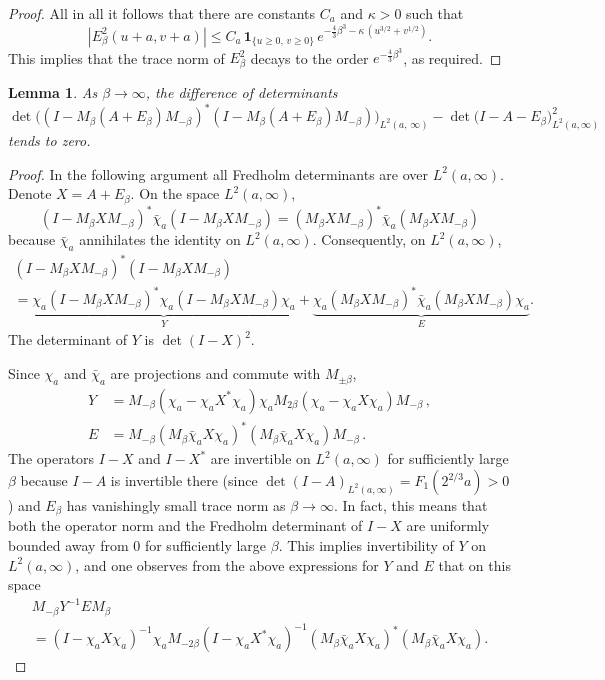 \documentclass[10pt]{amsart}
\newtheorem{lemm}[theo]{Lemma}\newtheorem{prop}[theo]{Proposition}\newtheorem{coro}[theo]{Corollary}\newtheorem{conj}[theo]{Conjecture}
\theoremstyle{definition}\newtheorem{defi}[theo]{Definition}\newtheorem{rema}[theo]{Remark}\newtheorem{exam}[theo]{Example}\newtheorem{exem}[theo]{Example}\newtheorem{nota}[theo]{Notation}
\newcommand{\ind}[1]{\mathbf{1}_{\{ #1 \}}}
\begin{document}
\begin{proof}
All in all it follows that there are constants $C_a$ and $\kappa > 0$ such that
\[
|E^2_{\beta}(u+a,v+a)| \leq C_a\, \ind{u \geq 0,\, v \geq 0}\, e^{-\frac{4}{3}\beta^3 - \kappa\, (u^{3/2} + v^{1/2})}.
\]
This implies that the trace norm of $E^2_{\beta}$ decays to the order $e^{-\frac{4}{3}\beta^3}$, as required.
\end{proof}

\begin{lemm} \label{lem:error2}
As $\beta \to \infty$, the difference of determinants
\[
\det \Big((I - M_{\beta}(A+ E_{\beta})M_{-\beta})^{*}
(I - M_{\beta}(A+ E_{\beta})M_{-\beta})\Big)_{L^2(a,\, \infty)} -
\det \big (I - A- E_{\beta}\big)_{L^2(a,\infty)}^2
\]
tends to zero.
\end{lemm}

\begin{proof}
In the following argument all Fredholm determinants are over $L^2(a,\infty)$. Denote $X = A + E_{\beta}$. On the space $L^2(a,\infty)$,
\[
(I- M_{\beta}XM_{-\beta})^{*} \bar{\chi}_a (I- M_{\beta}XM_{-\beta}) =
(M_{\beta} X M_{-\beta})^{*} \bar{\chi}_a (M_{\beta}XM_{-\beta})
\]
because $\bar{\chi}_a$ annihilates the identity on $L^2(a,\infty)$. Consequently, on $L^2(a,\infty)$,
\begin{multline*}
(I - M_{\beta}XM_{-\beta})^{*}(I - M_{\beta}XM_{-\beta}) \\
= \underbrace{\chi_a(I - M_{\beta}XM_{-\beta})^{*}\chi_a(I - M_{\beta}XM_{-\beta})\chi_a}_{Y} +
\underbrace{\chi_a(M_{\beta} X M_{-\beta})^{*} \bar{\chi}_a (M_{\beta}XM_{-\beta})\chi_a}_{E}.
\end{multline*}
The determinant of $Y$ is $\det(I-X)^2$.

Since $\chi_a$ and $\bar{\chi}_{a}$ are projections and commute with $M_{\pm \beta}$,
\begin{align*}
Y &= M_{-\beta} (\chi_a - \chi_a X^{*} \chi_a) \chi_a M_{2\beta} (\chi_a - \chi_a X \chi_a) M_{-\beta}\,,\\
E &= M_{-\beta} (M_{\beta}\bar{\chi}_aX\chi_a)^{*} (M_{\beta}\bar{\chi}_aX\chi_a) M_{-\beta}\,.
\end{align*}
The operators $I - X$ and $I - X^{*}$ are invertible on $L^2(a,\infty)$ for sufficiently large $\beta$ because $I-A$ is invertible there (since $\det(I-A)_{L^2(a,\infty)} = F_1(2^{2/3}a) > 0$) and $E_{\beta}$ has vanishingly small trace norm as $\beta \to \infty$. In fact, this means that both the operator norm and the Fredholm determinant of $I - X$ are uniformly bounded away from 0 for sufficiently large $\beta$. This implies invertibility of $Y$ on $L^2(a,\infty)$, and one observes from the above expressions for $Y$ and $E$ that on this space
\begin{multline}\label{eqn:error2a}
M_{-\beta} Y^{-1}E M_{\beta} \\
=(I-\chi_aX\chi_a)^{-1} \chi_a M_{-2\beta}(I-\chi_a X^{*} \chi_a)^{-1} (M_{\beta}\bar{\chi}_aX\chi_a)^{*} (M_{\beta}\bar{\chi}_aX\chi_a).
\end{multline}


\end{proof}
\end{document}
